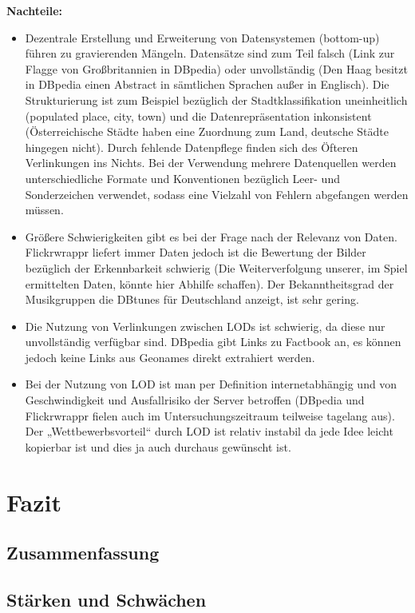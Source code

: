 \documentclass[a4paper, 11pt]{article}
\begin{document}
\textbf{Nachteile:}
\begin{itemize}
\item Dezentrale Erstellung und Erweiterung von Datensystemen (bottom-up) führen zu gravierenden Mängeln. Datensätze sind zum Teil falsch (Link zur Flagge von Großbritannien in DBpedia) oder unvollständig (Den Haag besitzt in DBpedia einen Abstract in sämtlichen Sprachen außer in Englisch). Die Strukturierung ist zum Beispiel bezüglich der Stadtklassifikation uneinheitlich (populated place, city, town) und die Datenrepräsentation inkonsistent (Österreichische Städte haben eine Zuordnung zum Land, deutsche Städte hingegen nicht). Durch fehlende Datenpflege finden sich des Öfteren Verlinkungen ins Nichts. Bei der Verwendung mehrere Datenquellen werden unterschiedliche Formate und Konventionen bezüglich Leer- und Sonderzeichen verwendet, sodass eine Vielzahl von Fehlern abgefangen werden müssen.
\item Größere Schwierigkeiten gibt es bei der Frage nach der Relevanz von Daten. Flickrwrappr liefert immer Daten jedoch ist die Bewertung der Bilder bezüglich der Erkennbarkeit schwierig (Die Weiterverfolgung unserer, im Spiel ermittelten Daten, könnte hier Abhilfe schaffen).  Der Bekanntheitsgrad der Musikgruppen die DBtunes für Deutschland anzeigt, ist sehr gering. 
\item Die Nutzung von Verlinkungen zwischen LODs ist schwierig, da diese nur unvollständig verfügbar sind. DBpedia gibt Links zu Factbook an, es können jedoch keine Links aus Geonames direkt extrahiert werden.   
\item Bei der Nutzung von LOD ist man per Definition internetabhängig und von Geschwindigkeit und Ausfallrisiko der Server betroffen (DBpedia und Flickrwrappr fielen auch im Untersuchungszeitraum teilweise tagelang aus). Der „Wettbewerbsvorteil“ durch LOD ist relativ instabil da jede Idee leicht kopierbar ist und dies ja auch durchaus gewünscht ist. 
\end{itemize}
\newpage
\section{Fazit}
\subsection{Zusammenfassung}
\subsection{Stärken und Schwächen}
\end{document}
